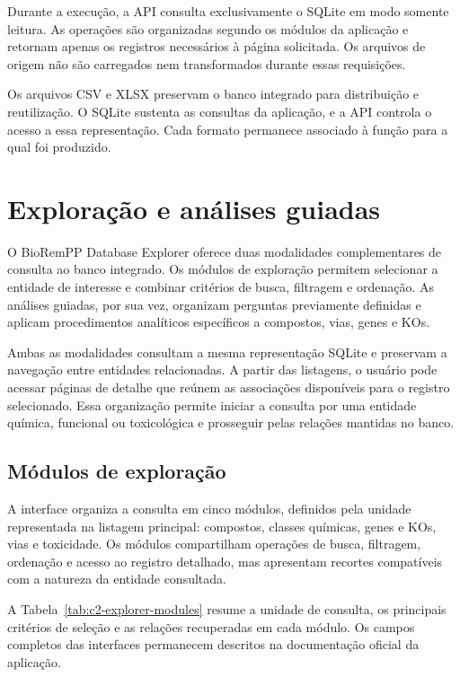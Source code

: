 Durante a execução, a API consulta exclusivamente o SQLite em modo somente
leitura. As operações são organizadas segundo os módulos da aplicação e
retornam apenas os registros necessários à página solicitada. Os arquivos de
origem não são carregados nem transformados durante essas requisições.

Os arquivos CSV e XLSX preservam o banco integrado para distribuição e
reutilização. O SQLite sustenta as consultas da aplicação, e a API controla o
acesso a essa representação. Cada formato permanece associado à função para a
qual foi produzido.

\section{Exploração e análises guiadas}
\label{sec:c2-exploracao}

O BioRemPP Database Explorer oferece duas modalidades complementares de
consulta ao banco integrado. Os módulos de exploração permitem selecionar a
entidade de interesse e combinar critérios de busca, filtragem e ordenação. As
análises guiadas, por sua vez, organizam perguntas previamente definidas e
aplicam procedimentos analíticos específicos a compostos, vias, genes e KOs.

Ambas as modalidades consultam a mesma representação SQLite e preservam a
navegação entre entidades relacionadas. A partir das listagens, o usuário pode
acessar páginas de detalhe que reúnem as associações disponíveis para o
registro selecionado. Essa organização permite iniciar a consulta por uma
entidade química, funcional ou toxicológica e prosseguir pelas relações
mantidas no banco.

\subsection{Módulos de exploração}

A interface organiza a consulta em cinco módulos, definidos pela unidade
representada na listagem principal: compostos, classes químicas, genes e KOs,
vias e toxicidade. Os módulos compartilham operações de busca, filtragem,
ordenação e acesso ao registro detalhado, mas apresentam recortes compatíveis
com a natureza da entidade consultada.

A Tabela~\ref{tab:c2-explorer-modules} resume a unidade de consulta, os
principais critérios de seleção e as relações recuperadas em cada módulo. Os
campos completos das interfaces permanecem descritos na documentação oficial
da aplicação.

